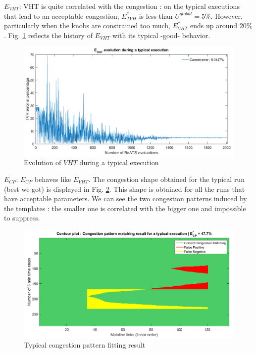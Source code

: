 \newpage
\emph{$E_{VHT}$}: VHT is quite correlated with the congestion : on the typical executions that lead to an acceptable congestion, $E_{TVH}^{*}$ is less than $U^{global}=5\%$. However, particularly when the knobs are constrained too much,  $E_{VHT}^{*}$ ends up around $20\%$.
Fig. \ref{fig:vhtexample} reflects the history of $E_{VHT}$ with its typical -good- behavior.
\begin{figure}[!h]
	\caption{Evolution of $VHT$ during a typical execution}
	\label{fig:vhtexample}
	\includegraphics[width=7in]{figures/results_figures/VHTexample.png}
\end{figure}
\emph{$E_{CP}$}: $E_{CP}$ behaves like $E_{VHT}$. The congestion shape obtained for the typical run (best we got) is displayed in Fig. \ref{fig:typicalcpexample}. This shape is obtained for all the runs that have acceptable parameters. We can see the two congestion patterns induced by the templates : the smaller one is correlated with the bigger one and impossible to suppress.\\
\begin{figure}[!h]
	\caption{Typical congestion pattern fitting result}
	\label{fig:typicalcpexample}
	\includegraphics[width=7in]{figures/results_figures/typicalcpexample.png}
\end{figure}	
